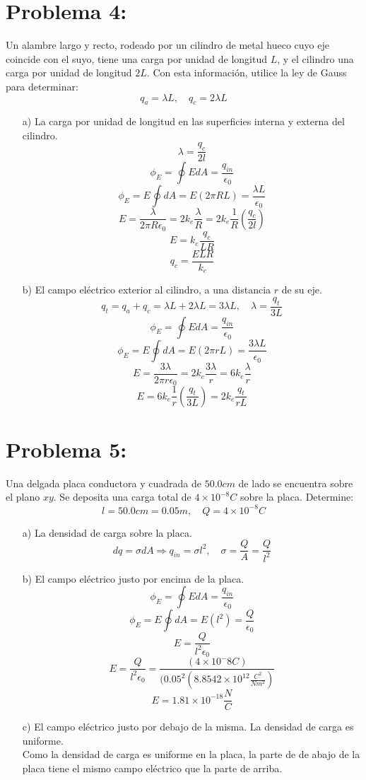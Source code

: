 \documentclass[12pt]{article}
\begin{document}
		\section{Problema 4:}\label{sec:Problema4}
			Un alambre largo y recto, rodeado por un cilindro de metal hueco cuyo eje coincide 
			con el suyo, tiene una carga por unidad de longitud $ L $, y el cilindro una carga por 
			unidad de longitud $ 2L $. Con esta información, utilice la ley de Gauss para determinar:  
			$$ q_a = \lambda L, \quad q_c = 2 \lambda L $$
			\begin{enumerate}
				\item[a)]	La carga por unidad de longitud en las superficies interna y externa del cilindro.
						$$ \lambda = \frac{q_c}{2l} $$ 
						$$ \phi_E = \oint EdA = \frac{q_{in}}{\epsilon_0} $$
						$$ \phi_E = E \oint dA = E(2 \pi R L)= \frac{\lambda L}{\epsilon_0} $$
						$$ E = \frac{\lambda}{2 \pi R \epsilon_0} = 2 k_e \frac{\lambda}{R} = 2 k_e \frac{1}{R} \left( \frac{q_c}{2l} \right) $$
						$$ E = k_e \frac{q_c}{LR} $$
						$$ q_c = \frac{ELR}{k_e} $$
				\item[b)] El campo eléctrico exterior al cilindro, a una distancia $ r $ de su eje.
						$$ q_t = q_a + q_c = \lambda L + 2 \lambda L = 3 \lambda L, \quad \lambda = \frac{q_t}{3L} $$
						$$ \phi_E = \oint EdA = \frac{q_{in}}{\epsilon_0} $$
						$$ \phi_E = E \oint dA = E(2 \pi r L)= \frac{3 \lambda L}{\epsilon_0} $$
						$$ E = \frac{3 \lambda}{2 \pi r \epsilon_0} = 2 k_e \frac{3\lambda}{r} = 6 k_e \frac{\lambda}{r} $$
						$$ E = 6 k_e \frac{1}{r} \left( \frac{q_t}{3L} \right) = 2 k_e \frac{q_t}{rL}$$
			\end{enumerate}

		\section{Problema 5:}\label{sec:Problema5}
			Una delgada placa conductora y cuadrada de $ 50.0cm $ de lado se encuentra sobre el 
			plano $ xy $. Se deposita una carga total de $ 4 \times 10^{-8} C $ sobre la placa. Determine: 
			$$ l = 50.0cm = 0.05m, \quad Q = 4 \times 10^{-8} C  $$
			\begin{enumerate}
				\item[a)]	La densidad de carga sobre la placa.
						$$ dq = \sigma dA \Longrightarrow q_{in} = \sigma l^2, \quad \sigma = \frac{Q}{A} = \frac{Q}{l^2} $$
				\item[b)]	El campo eléctrico justo por encima de la placa.
						$$ \phi_E = \oint EdA = \frac{q_{in}}{\epsilon_0} $$
						$$ \phi_E = E \oint dA = E(l^2)= \frac{Q}{\epsilon_0} $$
						$$ E = \frac{Q}{l^2 \epsilon_0} $$
						$$ E = \frac{Q}{l^2 \epsilon_0} = \frac{(4 \times 10^-{8} C)}{(0.05^2(8.8542 \times 10^{12} \frac{C^2}{Nm^2})} $$ 
						$$ E = 1.81 \times 10^{-18} \frac{N}{C} $$
				\item[c)] El campo eléctrico justo por debajo de la misma. La densidad de carga es uniforme. \\
						Como la densidad de carga es uniforme en la placa, la parte de de abajo de la placa tiene el mismo campo eléctrico que la parte de arriba.
			\end{enumerate}
\end{document}
